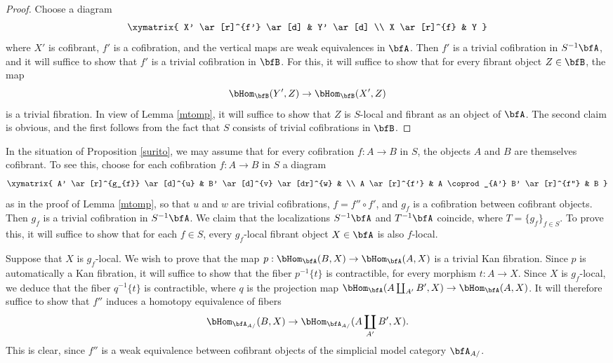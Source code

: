 \begin{Simplicial Categories}
\begin{proof}
Choose a diagram
$$ \xymatrix{ X' \ar[r]^{f'} \ar[d] & Y' \ar[d] \\
X \ar[r]^{f} & Y }$$
where $X'$ is cofibrant, $f'$ is a cofibration, and the vertical maps are weak equivalences in $\bfA$. Then $f'$ is a trivial cofibration in $S^{-1} \bfA$, and it will suffice to show that $f'$ is a trivial cofibration in $\bfB$. For this, it will suffice to show that for every fibrant object $Z \in \bfB$, the map
$$ \bHom_{\bfB}(Y', Z) \rightarrow \bHom_{\bfB}(X',Z)$$ is a trivial fibration. In view of Lemma \ref{mtomp}, it will suffice to show that $Z$ is $S$-local and fibrant as an object of $\bfA$. The second claim is obvious, and the first follows from the fact that $S$ consists of trivial cofibrations in $\bfB$. 
\end{proof}

\begin{remark}\label{surito2}
In the situation of Proposition \ref{surito}, we may assume that for every cofibration
$f: A \rightarrow B$ in $S$, the objects $A$ and $B$ are themselves cofibrant.
To see this, choose for each cofibration $f: A \rightarrow B$ in $S$ a diagram
$$ \xymatrix{ A' \ar[r]^{g_{f}} \ar[d]^{u} & B' \ar[d]^{v} \ar[dr]^{w} & \\
A \ar[r]^{f'} & A \coprod_{A'} B' \ar[r]^{f''} & B }$$
as in the proof of Lemma \ref{mtomp}, so that $u$ and $w$ are trivial cofibrations,
$f = f'' \circ f'$, and $g_f$ is a cofibration between cofibrant objects. Then $g_{f}$ is a trivial cofibration in $S^{-1} \bfA$. We claim that the localizations $S^{-1} \bfA$ and
$T^{-1} \bfA$ coincide, where $T = \{ g_{f} \}_{f \in S}$. To prove this, it will suffice to show that
for each $f \in S$, every $g_{f}$-local fibrant object $X \in \bfA$ is also $f$-local.

Suppose that $X$ is $g_{f}$-local. We wish to prove that the map
$p: \bHom_{\bfA}(B, X) \rightarrow \bHom_{\bfA}(A,X)$ is a trivial Kan fibration.
Since $p$ is automatically a Kan fibration, it will suffice to show that the fiber
$p^{-1} \{t\}$ is contractible, for every morphism $t: A \rightarrow X$. 
Since $X$ is $g_{f}$-local, we deduce that the fiber $q^{-1} \{t\}$ is contractible, where
$q$ is the projection map
$\bHom_{\bfA}( A \coprod_{A'} B', X) \rightarrow \bHom_{\bfA}(A, X)$. It will therefore
suffice to show that $f''$ induces a homotopy equivalence of fibers
$$ \bHom_{\bfA_{A/}}(B,X) \rightarrow \bHom_{ \bfA_{A/}}( A \coprod_{A'} B', X).$$
This is clear, since $f''$ is a weak equivalence between cofibrant objects
of the simplicial model category $\bfA_{A/}$.
\end{remark}


\end{Simplicial Categories}
